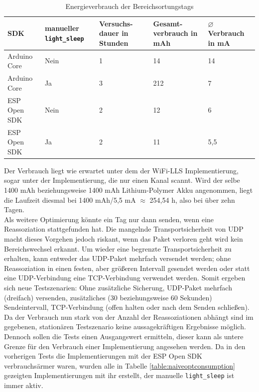 \begin{table}[h]
	\centering
	\caption{Energieverbrauch der Bereichsortungstags}
	\label{table:naiveconsumption}
	\begin{tabular}{p{3cm}|p{2.2cm}|p{1.7cm}|p{2.5cm}|p{2.5cm}}
		SDK & manueller \texttt{light\_sleep} & Versuchs-dauer in Stunden & Gesamt-verbrauch in mAh & $\varnothing$ Verbrauch in mA \\
		\hline
		Arduino Core & Nein & 1 & 14 & 14 \\
		Arduino Core & Ja & 3 & 212 & 7 \\
		ESP Open SDK & Nein & 2 & 12 & 6 \\
		ESP Open SDK & Ja & 2 & 11 & 5,5 \\
	\end{tabular}
\end{table}

Der Verbrauch liegt wie erwartet unter dem der WiFi-LLS Implementierung, sogar unter der Implementierung, die nur einen Kanal scannt.
Wird der selbe 1400 mAh beziehungsweise 1400 mAh Lithium-Polymer Akku angenommen, liegt die Laufzeit diesmal  bei 1400 mAh/5,5 mA $\approx$ 254,54 h, also bei über zehn Tagen. \\
Als weitere Optimierung könnte ein Tag nur dann senden, wenn eine Reassoziation stattgefunden hat.
Die mangelnde Transportsicherheit von UDP macht dieses Vorgehen jedoch riskant, wenn das Paket verloren geht wird kein Bereichswechsel erkannt.
Um wieder eine begrenzte Transportsicherheit zu erhalten, kann entweder das UDP-Paket mehrfach versendet werden; ohne Reassoziation in einen festen, aber größeren Intervall gesendet werden oder statt eine UDP-Verbindung eine TCP-Verbindung verwendet werden.
Somit ergeben sich neue Testszenarien: Ohne zusätzliche Sicherung, UDP-Paket mehrfach (dreifach) versenden, zusätzliches (30 beziehungsweise 60 Sekunden) Sendeintervall, TCP-Verbindung (offen halten oder nach dem Senden schließen). \\
Da der Verbrauch nun stark von der Anzahl der Reassoziationen abhängt sind im gegebenen, stationären Testszenario keine aussagekräftigen Ergebnisse möglich.
Dennoch sollen die Tests einen Ausgangswert ermitteln, dieser kann als untere Grenze für den Verbrauch einer Implementierung angesehen werden.
Da in den vorherigen Tests die Implementierungen mit der ESP Open SDK verbrauchsärmer waren, wurden alle in Tabelle \ref{table:naiveoptconsumption} gezeigten Implementierungen mit ihr erstellt, der manuelle \texttt{light\_sleep} ist immer aktiv.

